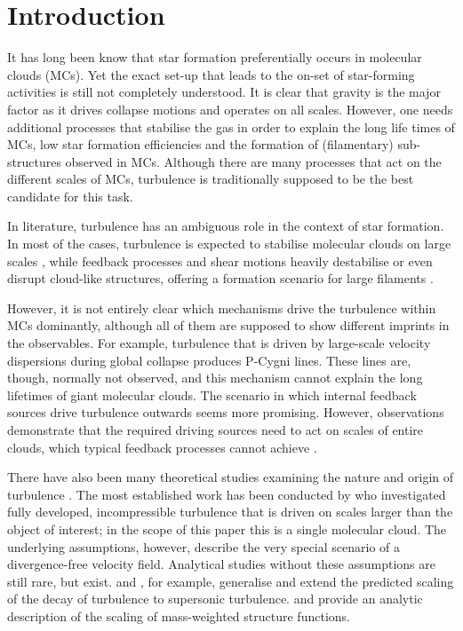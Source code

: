 \section{Introduction}\label{intro}

It has long been know that star formation preferentially occurs in molecular clouds (MCs). 
Yet the exact set-up that leads to the on-set of star-forming activities is still not completely understood.
It is clear that gravity is the major factor as it drives collapse motions and operates on all scales.
However, one needs additional processes that stabilise the gas in order to explain the long life times of MCs, low star formation efficiencies and the formation of (filamentary) sub-structures observed in MCs. 
Although there are many processes that act on the different scales of MCs, turbulence is traditionally supposed to be the best candidate for this task.

In literature, turbulence has an ambiguous role in the context of star formation. 
In most of the cases, turbulence is expected to stabilise molecular clouds on large scales \citep{Fleck1980,McKee1992,MacLow2003}, while feedback processes and shear motions heavily destabilise or even disrupt cloud-like structures, offering a formation scenario for large filaments \citep{Tan2013,Miyamoto2014}. 


However, it is not entirely clear which mechanisms drive the turbulence within MCs dominantly, although all of them are supposed to show different imprints in the observables. 
For example, turbulence that is driven by large-scale velocity dispersions during global collapse \citep{Ballesteros2011a,Ballesteros2011b,Hartmann2012} produces P-Cygni lines. 
These lines are, though, normally not observed, and this mechanism cannot explain the long lifetimes of giant molecular clouds. 
The scenario in which internal feedback sources drive turbulence outwards \citep{Dekel2013,Krumholz2014} seems more promising. 
However, observations demonstrate that the required driving sources need to act on scales of entire clouds, which typical feedback processes cannot achieve \citep{Brunt2009,Brunt2013,Heyer2004}.

There have also been many theoretical studies examining the nature and origin of turbulence \citep[and references within]{MacLow2004}. 
The most established work has been conducted by \citet{Kolmogorov1941} who investigated fully developed, incompressible turbulence that is driven on scales larger than the object of interest; in the scope of this paper this is a single molecular cloud. 
The underlying assumptions, however, describe the very special scenario of a divergence-free velocity field. 
Analytical studies without these assumptions are still rare, but exist. 
\citet{She1994} and \citet{Boldyrev2002}, for example, generalise and extend the predicted scaling of the decay of turbulence to supersonic turbulence.
\citet{Galtier2011} and \citet{Banerjee2013} provide an analytic description of the scaling of mass-weighted structure functions.

